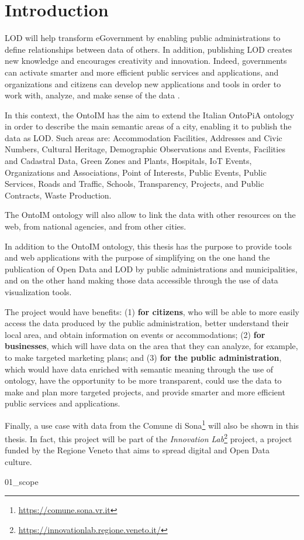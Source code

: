 \chapter{Introduction}
\label{chp:introduction}

\acl{LOD} will help transform eGovernment by enabling public administrations to define relationships between data of others. In addition, publishing \acl{LOD} creates new knowledge and encourages creativity and innovation. Indeed, governments can activate smarter and more efficient public services and applications, and organizations and citizens can develop new applications and tools in order to work with, analyze, and make sense of the data \cite{isa2013lod}.

In this context, the \ac{OntoIM} has the aim to extend the Italian OntoPiA ontology in order to describe the main semantic areas of a city, enabling it to publish the data as \acl{LOD}. Such areas are: Accommodation Facilities, Addresses and Civic Numbers, Cultural Heritage, Demographic Observations and Events, Facilities and Cadastral Data, Green Zones and Plants, Hospitals, IoT Events, Organizations and Associations, Point of Interests, Public Events, Public Services, Roads and Traffic, Schools, Transparency, Projects, and Public Contracts, Waste Production.

The \ac{OntoIM} ontology will also allow to link the data with other resources on the web, from national agencies, and from other cities.

In addition to the \ac{OntoIM} ontology, this thesis has the purpose to provide tools and web applications with the purpose of simplifying on the one hand the publication of Open Data and \acl{LOD} by public administrations and municipalities, and on the other hand making those data accessible through the use of data visualization tools.

The project would have benefits: (1) \textbf{for citizens}, who will be able to more easily access the data produced by the public administration, better understand their local area, and obtain information on events or accommodations; (2) \textbf{for businesses}, which will have data on the area that they can analyze, for example, to make targeted marketing plans; and (3) \textbf{for the public administration}, which would have data enriched with semantic meaning through the use of ontology, have the opportunity to be more transparent, could use the data to make and plan more targeted projects, and provide smarter and more efficient public services and applications.

Finally, a use case with data from the Comune di Sona\footnote{\url{https://comune.sona.vr.it}} will also be shown in this thesis. In fact, this project will be part of the \textit{Innovation Lab}\footnote{\url{https://innovationlab.regione.veneto.it/}} project, a project funded by the Regione Veneto that aims to spread digital and Open Data culture.

{01_scope}%